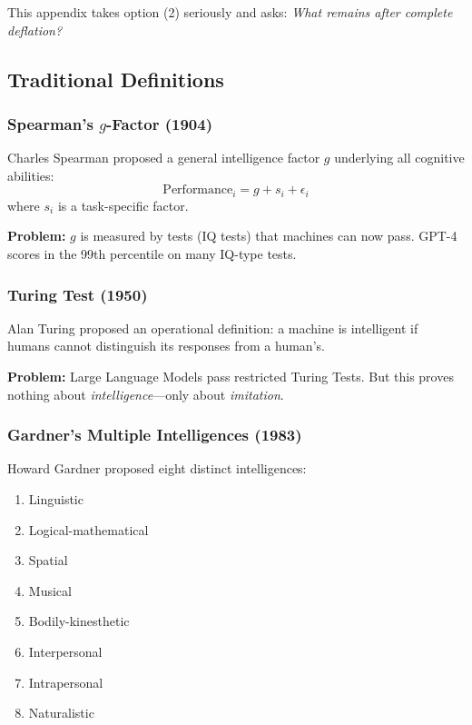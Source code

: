 This appendix takes option (2) seriously and asks: \textit{What remains after complete deflation?}


\subsection{Traditional Definitions}

\subsubsection{Spearman's $g$-Factor (1904)}

Charles Spearman proposed a general intelligence factor $g$ underlying all cognitive abilities:
\begin{equation}
\text{Performance}_i = g + s_i + \epsilon_i
\end{equation}
where $s_i$ is a task-specific factor.

\textbf{Problem:} $g$ is measured by tests (IQ tests) that machines can now pass. GPT-4 scores in the 99th percentile on many IQ-type tests.

\subsubsection{Turing Test (1950)}

Alan Turing proposed an operational definition: a machine is intelligent if humans cannot distinguish its responses from a human's.

\textbf{Problem:} Large Language Models pass restricted Turing Tests. But this proves nothing about \textit{intelligence}---only about \textit{imitation}.

\subsubsection{Gardner's Multiple Intelligences (1983)}

Howard Gardner proposed eight distinct intelligences:
\begin{enumerate}
    \item Linguistic
    \item Logical-mathematical
    \item Spatial
    \item Musical
    \item Bodily-kinesthetic
    \item Interpersonal
    \item Intrapersonal
    \item Naturalistic
\end{enumerate}

